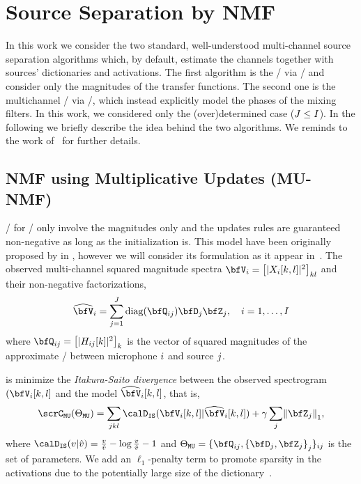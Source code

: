 \section{Source Separation by NMF}
In this work we consider the two standard, well-understood multi-channel source separation algorithms which, by default, estimate the channels together with sources' dictionaries and activations.
The first algorithm is the \NMFdef/ via \MUdef/ and consider only the magnitudes of the transfer functions.
The second one is the multichannel \NMF/ via \EMdef/, which instead explicitly model the phases of the mixing filters.
In this work, we considered only the (over)determined case ($J \leq I$).
In the following we briefly describe the idea behind the two algorithms.
We reminds to the work of~ for further details.

\subsection{NMF using Multiplicative Updates (MU-NMF)}\label{sec:separake:mu}
\MU/ for \NMF/ only involve the magnitudes only and the updates rules are guaranteed non-negative as long as the initialization is.
This model have been originally proposed by in , however we will consider its formulation as it appear in~.
The observed multi-channel squared magnitude spectra $\mV_\idxMic = \klist{\powerOf{\MIC_\idxMic[k,l]}}_{kl}$ and their non-negative factorizations,
\begin{equation}
    \label{eq:mu_nmf}
    \wh{\mV}_\idxMic = \sum_{\idxSrc=1}^{\numSrcs} \diag(\vQ_{\idxMicSrc}) \mD_\idxSrc \mZ_\idxSrc , \quad \idxMic=1,\ldots,\numMics
\end{equation}
where $\vQ_{\idxMicSrc} = \klist{\powerOf{\FLT_{\idxMicSrc}[k]}}_k$ is the vector of squared magnitudes of the approximate \RTF/ between microphone $i$ and source $j$.

 is minimize the \textit{Itakura-Saito divergence}  between the observed spectrogram $(\mV_{\idxMic}[k,l]$ and the model $\wh{\mV}_{\idxMic}[k,l]$, that is,
\begin{equation}
    \scrC_{\mathtt{MU}}(\Theta_{\mathtt{MU}}) = \sum_{\idxSrc k l} \calD_{\mathtt{IS}}(\mV_{\idxMic}[k,l] | \wh{\mV}_{\idxMic}[k,l])
    + \gamma \sum_\idxSrc \kvvbar{\mZ_\idxSrc}_1,
\end{equation}
where $\calD_{\mathtt{IS}}( v | \hat{v} ) = \frac{v}{\hat{v}} - \log \frac{v}{\hat{v}} - 1$ and $\Theta_{\mathtt{MU}} = \{\vQ_{\idxMicSrc}, \set{\mD_\idxSrc, \mZ_\idxSrc}_\idxSrc\}_{\idxMicSrc}$ is the set of parameters.
We add an $\ell_1$-penalty term to promote sparsity in the activations due to the potentially large size of the dictionary~.

